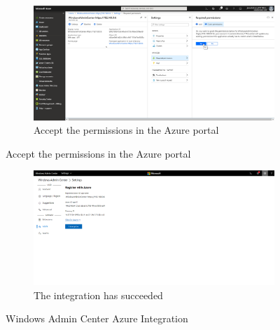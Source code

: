 \begin{figure}[h]\ContinuedFloat
\begin{subfigure}{\textwidth}
		\captionsetup{width=0.7\linewidth}
		\includegraphics[width=0.75\linewidth]{img/WAC_Azure_5.png} 
		\centering
		\caption{Accept the permissions in the Azure portal}
		\label{fig:WACAzure5}
	\end{subfigure}
\end{figure}
\begin{figure}[h]\ContinuedFloat
	\begin{subfigure}{\textwidth}
		\captionsetup{width=0.7\linewidth}
		\includegraphics[width=0.75\linewidth]{img/WAC_Azure_6.png}
		\centering
		\caption{The integration has succeeded}
		\label{fig:WACAzure6}
	\end{subfigure}
	\caption{Windows Admin Center Azure Integration}
	\label{fig:WACAzure}
\end{figure}